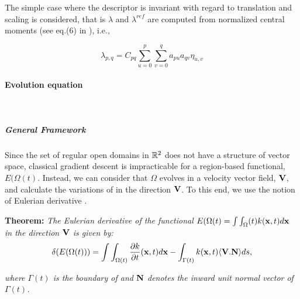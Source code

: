 The simple case where the descriptor is invariant with regard to translation and scaling is considered, that is $\lambda$ and $\lambda^{ref}$ are computed from normalized central moments (see eq.(6) in \cite{Foulonneau2006}), i.e.,

\begin{equation}
  \label{eq:NRJ_moment_foulonneau}
  \lambda_{p,q} = C_{pq} \sum_{u=0}^p{ \sum_{v=0}^q{ a_{pu}a_{qv}\eta_{u,v} } }
\end{equation}


\paragraph{Evolution equation}
~\par \vspace{-0.5cm}
\subparagraph{General Framework}
\label{sspar:GenFW_foulonneau}
Since the set of regular open domains in $\mathbb{R}^2$ does not have a structure of vector space, classical gradient descent is impracticable for a region-based functional, $E(\Omega(t)$. Instead, we can consider that $\Omega$ evolves in a velocity vector field, $\mathbf{V}$, and calculate the variations of in the direction $\mathbf{V}$. To this end, we use the notion of Eulerian derivative \cite{Aubert2003}.

\textbf{Theorem:} \emph{The Eulerian derivative of the functional $E(\Omega(t) = \int \int_\Omega(t) k(\mathbf{x},t) d\mathbf{x}$ in the direction $\mathbf{V}$ is given by:}
\begin{equation}
  \label{eq:dNRJ-aubert}
  \delta(E(\Omega(t))) = \int\int_{\Omega(t)}{\frac{\partial k}{\partial t}(\mathbf{x},t) d\mathbf{x}} - \int_{\Gamma(t)}{k(\mathbf{x},t) \langle\mathbf{V}.\mathbf{N}\rangle ds},
\end{equation}

\emph{where $\Gamma(t)$ is the boundary of and $\mathbf{N}$ denotes the inward unit normal vector of $\Gamma(t)$.}

